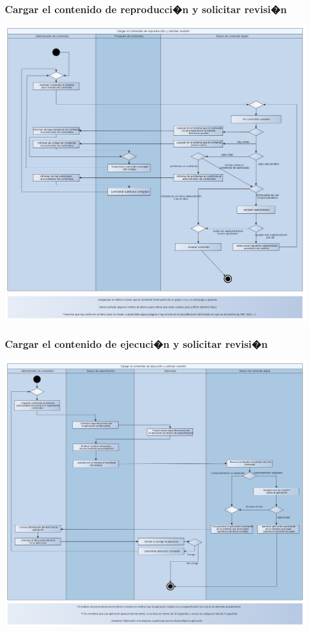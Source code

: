 \documentclass[11pt, a4paper, spanish]{article}
\begin{document}
{\subsubsection{Cargar el contenido de reproducci�n y solicitar revisi�n}

	\begin{center}
		\includegraphics[scale=0.37]{Diagramas/04-CargarElContenidoDeReproduccionYSolicitarRevisionDA.png}
	\end{center}

\newpage

\subsubsection{Cargar el contenido de ejecuci�n y solicitar revisi�n}

	\begin{center}
		\includegraphics[scale=0.37]{Diagramas/05-CargarElContenidoDeEjecucionYSolicitarRevisionDA.png}
	\end{center}

}
\end{document}
